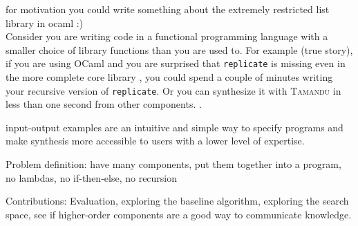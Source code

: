 for motivation you could write something about the extremely restricted list library in ocaml :)\\
Consider you are writing code in a functional programming language with a smaller choice of library functions than you are used to. For example (true story), if you are using OCaml and you are surprised that \lstinline?replicate? is missing even in the more complete core library , you could spend a couple of minutes writing your recursive version of \lstinline?replicate?. Or you can synthesize it with \textsc{Tamandu} in less than one second from other components. .

input-output examples are an intuitive and simple way to specify programs and make synthesis more accessible to users with a lower level of expertise.


Problem definition: have many components, put them together into a program, no lambdas, no if-then-else, no recursion
  

  
  
Contributions: Evaluation, exploring the baseline algorithm, exploring the search space, see if higher-order components are a good way to communicate knowledge.
